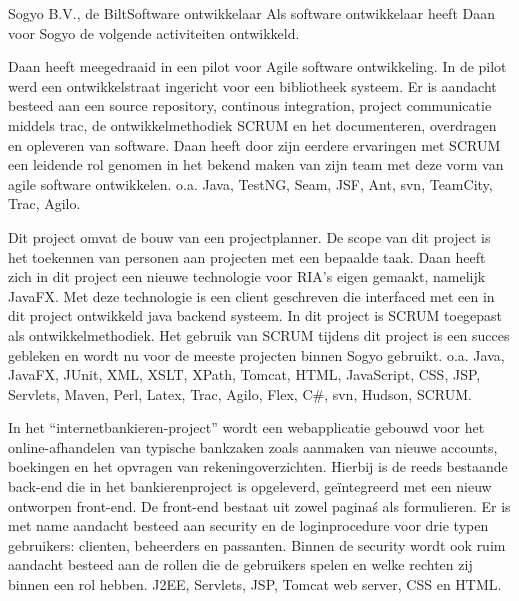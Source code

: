 	\begin{workExperience}{Sogyo B.V., de Bilt}{Software ontwikkelaar}{}
		Als software ontwikkelaar heeft Daan voor Sogyo de volgende 
		activiteiten ontwikkeld.
		
		Daan heeft meegedraaid in een pilot voor Agile software ontwikkeling. In
		de pilot werd een ontwikkelstraat ingericht voor een bibliotheek 
		systeem. Er is aandacht besteed aan	een source repository, continous 
		integration, project communicatie middels trac, de ontwikkelmethodiek 
		SCRUM en het documenteren, overdragen en opleveren van software.
		Daan heeft door zijn eerdere ervaringen met SCRUM een leidende rol
		genomen in het bekend maken van zijn team met deze vorm van agile 
		software ontwikkelen.
		\technics o.a. Java, TestNG, Seam, JSF, Ant, svn, TeamCity, Trac, Agilo.
		
		Dit project omvat de bouw van een projectplanner. De scope van dit 
		project is het toekennen van personen aan projecten met een bepaalde 
		taak. Daan heeft zich in dit project een nieuwe technologie voor RIA's 
		eigen gemaakt, namelijk JavaFX. Met deze technologie is een client 
		geschreven die interfaced met een in dit project ontwikkeld java backend
		systeem. In dit project is SCRUM toegepast als ontwikkelmethodiek. Het 
		gebruik van SCRUM tijdens dit project is een succes gebleken en wordt nu
		voor de meeste projecten binnen Sogyo gebruikt.
		\technics o.a. Java, JavaFX, JUnit, XML, XSLT, XPath, Tomcat, HTML, 
		JavaScript, CSS, JSP, Servlets, Maven, Perl, Latex, Trac, Agilo, Flex, 
		C\#, svn, Hudson, SCRUM.

		In het ``internetbankieren-project'' wordt een webapplicatie gebouwd voor
		het online-afhandelen van typische bankzaken zoals aanmaken van nieuwe 
		accounts, boekingen en het opvragen van rekeningoverzichten. Hierbij is
		de reeds bestaande back-end die in het bankierenproject is opgeleverd, 
		ge\"integreerd met een nieuw ontworpen front-end. De front-end bestaat uit
		zowel pagina\'s als formulieren. Er is met name aandacht besteed aan
		security en de loginprocedure voor drie typen gebruikers: clienten, 
		beheerders en passanten. Binnen de security wordt ook ruim aandacht 
		besteed aan de rollen die de gebruikers spelen en welke rechten zij
		binnen een rol hebben.
		\technics J2EE, Servlets, JSP, Tomcat web server, CSS en HTML. 
		

\end{workExperience}
